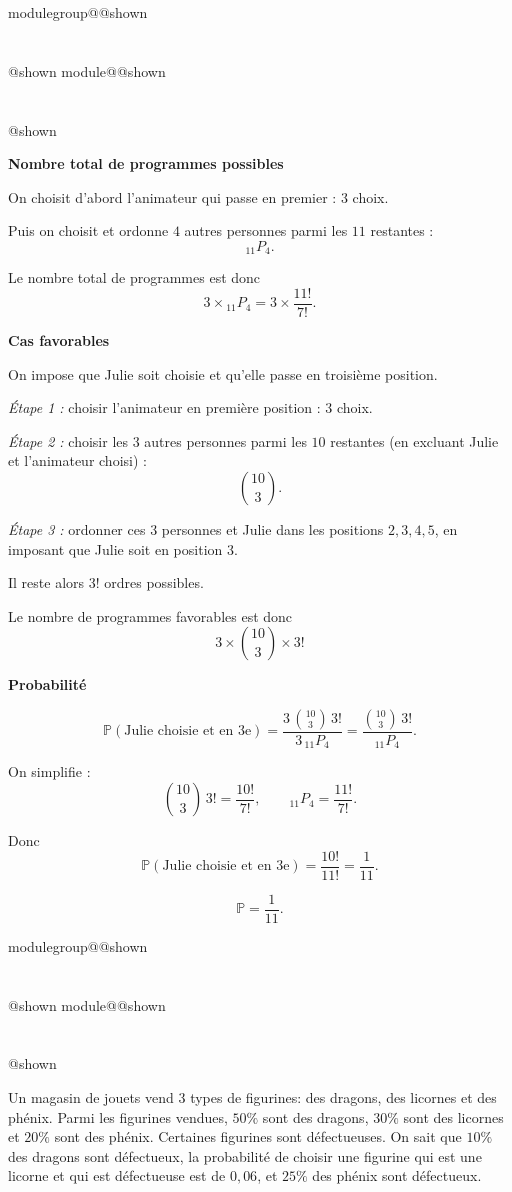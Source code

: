 \documentclass{Evaluation}
\makeatletter
\newcommand{\currentmodulekey}{}
\newcommand{\currentmoduletitle}{}
\newcommand{\currentgroupkey}{}
\newcommand{\currentgrouptitle}{}
\newcommand{\showmoduleifneeded}{%
  \ifx\currentgroupkey\empty\else
    \expandafter\ifx\csname modulegroup@\currentgroupkey @shown\endcsname\relax
      \section*{\currentgrouptitle}%
      \expandafter\gdef\csname modulegroup@\currentgroupkey @shown\endcsname{1}%
    \fi
  \fi
  \expandafter\ifx\csname module@\currentmodulekey @shown\endcsname\relax
    \section*{\currentmoduletitle}%
    \expandafter\gdef\csname module@\currentmodulekey @shown\endcsname{1}%
  \fi
}
\newenvironment{H26r}{\showmoduleifneeded}{}
\makeatother
\begin{document}
\begin{questions}
\begin{H26r}
\begin{solution}
\textbf{Nombre total de programmes possibles}

On choisit d’abord l’animateur qui passe en premier : \(3\) choix.

Puis on choisit et ordonne \(4\) autres personnes parmi les \(11\) restantes :
\[
{}_{11}P_{4}.
\]

Le nombre total de programmes est donc
\[
3\times {}_{11}P_{4}
=3\times \frac{11!}{7!}.
\]

\medskip
\textbf{Cas favorables}

On impose que Julie soit choisie et qu’elle passe en troisième position.

\emph{Étape 1 :} choisir l’animateur en première position : \(3\) choix.

\emph{Étape 2 :} choisir les \(3\) autres personnes parmi les \(10\) restantes (en excluant Julie et l’animateur choisi) :
\[
\binom{10}{3}.
\]

\emph{Étape 3 :} ordonner ces \(3\) personnes et Julie dans les positions
\(2,3,4,5\), en imposant que Julie soit en position \(3\).

Il reste alors \(3!\) ordres possibles.

Le nombre de programmes favorables est donc
\[
3\times \binom{10}{3}\times 3!
\]

\medskip
\textbf{Probabilité}

\[
\mathbb{P}(\text{Julie choisie et en 3e})
=
\frac{3\,\binom{10}{3}\,3!}{3\,{}_{11}P_{4}}
=
\frac{\binom{10}{3}\,3!}{{}_{11}P_{4}}.
\]

On simplifie :
\[
\binom{10}{3}\,3!
=
\frac{10!}{7!},
\qquad
{}_{11}P_{4}=\frac{11!}{7!}.
\]

Donc
\[
\mathbb{P}(\text{Julie choisie et en 3e})
=
\frac{10!}{11!}
=
\frac{1}{11}.
\]

\[
\boxed{\mathbb{P}=\frac{1}{11}.}
\]
\end{solution}
\end{H26r}

\begin{H26r}
\question {} %

Un magasin de jouets vend 3 types de figurines: des dragons, des licornes et des phénix. Parmi les figurines vendues, $50\%$ sont des dragons, $30\%$ sont des licornes et $20\%$ sont des phénix. Certaines figurines sont défectueuses. On sait que $10\%$ des dragons sont défectueux, la probabilité de choisir une figurine qui est une licorne et qui est défectueuse est de $0{,}06$, et $25\%$ des phénix sont défectueux.


\end{H26r}
\end{questions}
\end{document}
